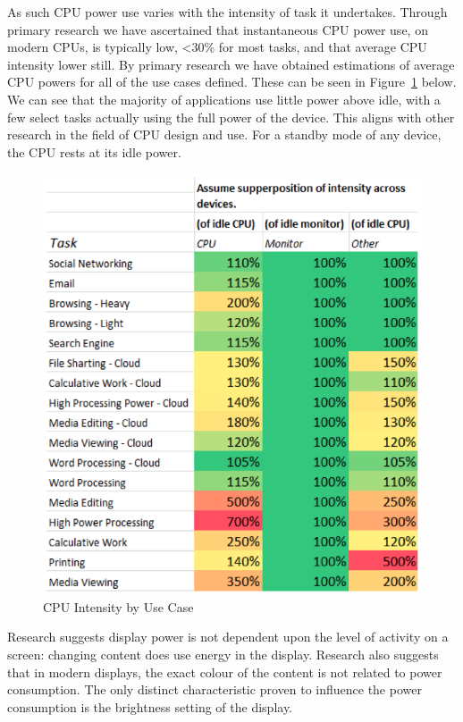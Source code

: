\documentclass[conference]{IEEEtran}
\begin{document}
As such CPU power use varies with the intensity of task it
undertakes. Through primary research we have ascertained that
instantaneous CPU power use, on modern CPUs, is typically low, <30\%
for most tasks, and that average CPU intensity lower still. By primary
research we have obtained estimations of average CPU powers for all of
the use cases defined. These can be seen in
Figure~\ref{fig:cpuintensity} below. We can see that the majority of
applications use little power above idle, with a few select tasks
actually using the full power of the device. This aligns with other
research in the field of CPU design and use. For a standby mode of any
device, the CPU rests at its idle power.

\begin{figure}[!ht]
\centering
\includegraphics[width=\columnwidth]{images/cpuintensity_usecase.png}
\caption{CPU Intensity by Use Case}
\label{fig:cpuintensity} 
\end{figure}


Research suggests display power is not dependent upon the level of
activity on a screen: changing content does use energy in the
display. Research also suggests that in modern displays, the exact
colour of the content is not related to power consumption. The only
distinct characteristic proven to influence the power consumption is
the brightness setting of the display.
\end{document}

